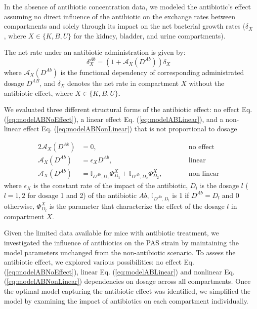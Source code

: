 \documentclass{article}
\begin{document}
In the absence of antibiotic concentration data, we modeled the antibiotic's effect assuming no direct influence of the antibiotic on the exchange rates between compartments and solely through its impact on the net bacterial growth rates ($\delta_{X}$, where $X \in \{K,B,U\}$ for the kidney, bladder, and urine compartments). 

The net rate under an antibiotic administration is given by: 
\begin{equation}
\delta_{X}^{Ab} = \left( 1 + \mathcal{A}_{X}(D^{Ab}) \right) \delta_{X}
\label{eq:deltaAntibiotic}
\end{equation}
where $\mathcal{A}_{X}(D^{Ab})$ is the functional dependency of corresponding administrated dosage $D^{AB}$, and $\delta_X$ denotes the net rate in compartment $X$ without the antibiotic effect, where $X \in \{K, B, U\}$.

We evaluated three different structural forms of the antibiotic effect: no effect Eq. (\ref{eq:modelABNoEffect}), a linear effect Eq. (\ref{eq:modelABLinear}), and a non-linear effect Eq. (\ref{eq:modelABNonLinear}) that is not proportional to dosage

\begin{alignat}{2}
	\mathcal{A}_{X}(D^{Ab}) &= 0, &\quad\quad\quad \text{no effect} \label{eq:modelABNoEffect} \\
	\mathcal{A}_{X}(D^{Ab}) &= \epsilon_{X} D^{Ab}, &\quad\quad\quad \text{linear} \label{eq:modelABLinear}\\
	\mathcal{A}_{X}(D^{Ab}) &= \mathbb{I}_{D^{Ab},D_1} \Phi_{D_1}^{X} + \mathbb{I}_{D^{Ab},D_2} \Phi_{D_2}^{X}, &\quad\quad\quad \text{non-linear} \label{eq:modelABNonLinear} 
\end{alignat}
where $\epsilon_{X}$  is the constant rate of the impact of the antibiotic, $D_l$ is the dosage $l$ ($l=1,2$ for dosage 1 and 2) of the antibiotic $Ab$, $\mathbb{I}_{D^{Ab},D_l}$ is 1 if $D^{Ab} = D_l$ and 0 otherwise, $\Phi_{D_l}^{X}$ is the parameter that characterize the effect of the dosage $l$ in compartment $X$.

Given the limited data available for mice with antibiotic treatment, we investigated the influence of antibiotics on the PAS strain by maintaining the model parameters unchanged from the non-antibiotic scenario. To assess the antibiotic effect, we explored various possibilities: no effect Eq. (\ref{eq:modelABNoEffect}), linear Eq. (\ref{eq:modelABLinear}) and nonlinear Eq. (\ref{eq:modelABNonLinear}) dependencies on dosage across all compartments. Once the optimal model capturing the antibiotic effect was identified, we simplified the model by examining the impact of antibiotics on each compartment individually.
\end{document}
